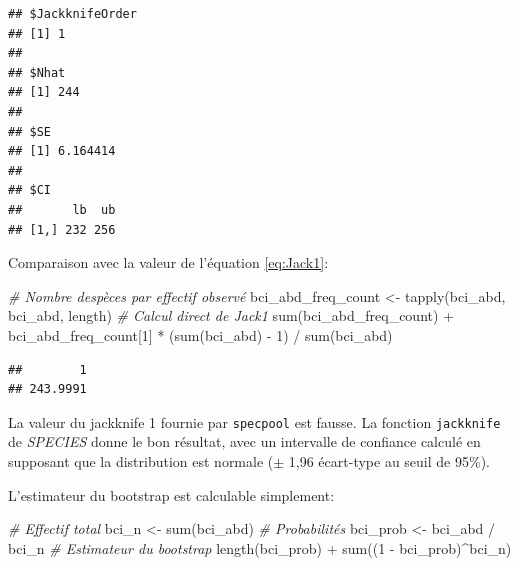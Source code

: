 \documentclass[
  11pt,
  american,
  a4paper,
  extrafontsizes,onecolumn,openright
  ]{memoir}
\newenvironment{Shaded}{\begin{snugshade}}{\end{snugshade}}
\newcommand{\CommentTok}[1]{\textcolor[rgb]{0.56,0.35,0.01}{\textit{#1}}}
\newcommand{\DecValTok}[1]{\textcolor[rgb]{0.00,0.00,0.81}{#1}}
\newcommand{\FunctionTok}[1]{\textcolor[rgb]{0.00,0.00,0.00}{#1}}
\newcommand{\NormalTok}[1]{#1}
\newcommand{\OtherTok}[1]{\textcolor[rgb]{0.56,0.35,0.01}{#1}}
\newcommand{\SpecialCharTok}[1]{\textcolor[rgb]{0.00,0.00,0.00}{#1}}
\begin{document}
\begin{verbatim}
## $JackknifeOrder
## [1] 1
## 
## $Nhat
## [1] 244
## 
## $SE
## [1] 6.164414
## 
## $CI
##       lb  ub
## [1,] 232 256
\end{verbatim}

\normalsize

Comparaison avec la valeur de l'équation \eqref{eq:Jack1}:

\scriptsize

\begin{Shaded}
\begin{Highlighting}[]
\CommentTok{\# Nombre d\textquotesingle{}espèces par effectif observé}
\NormalTok{bci\_abd\_freq\_count }\OtherTok{\textless{}{-}} \FunctionTok{tapply}\NormalTok{(bci\_abd, bci\_abd, length)}
\CommentTok{\# Calcul direct de Jack1}
\FunctionTok{sum}\NormalTok{(bci\_abd\_freq\_count) }\SpecialCharTok{+} 
\NormalTok{  bci\_abd\_freq\_count[}\DecValTok{1}\NormalTok{] }\SpecialCharTok{*}\NormalTok{ (}\FunctionTok{sum}\NormalTok{(bci\_abd) }\SpecialCharTok{{-}} \DecValTok{1}\NormalTok{) }\SpecialCharTok{/} \FunctionTok{sum}\NormalTok{(bci\_abd)}
\end{Highlighting}
\end{Shaded}

\begin{verbatim}
##        1 
## 243.9991
\end{verbatim}

\normalsize

La valeur du jackknife 1 fournie par \texttt{specpool} est fausse.
La fonction \texttt{jackknife} de \emph{SPECIES} donne le bon résultat, avec un intervalle de confiance calculé en supposant que la distribution est normale (\(\pm\) 1,96 écart-type au seuil de 95\%).

L'estimateur du bootstrap est calculable simplement:

\scriptsize

\begin{Shaded}
\begin{Highlighting}[]
\CommentTok{\# Effectif total}
\NormalTok{bci\_n }\OtherTok{\textless{}{-}} \FunctionTok{sum}\NormalTok{(bci\_abd)}
\CommentTok{\# Probabilités}
\NormalTok{bci\_prob }\OtherTok{\textless{}{-}}\NormalTok{ bci\_abd }\SpecialCharTok{/}\NormalTok{ bci\_n}
\CommentTok{\# Estimateur du bootstrap}
\FunctionTok{length}\NormalTok{(bci\_prob) }\SpecialCharTok{+} \FunctionTok{sum}\NormalTok{((}\DecValTok{1} \SpecialCharTok{{-}}\NormalTok{ bci\_prob)}\SpecialCharTok{\^{}}\NormalTok{bci\_n)}
\end{Highlighting}
\end{Shaded}
\end{document}
